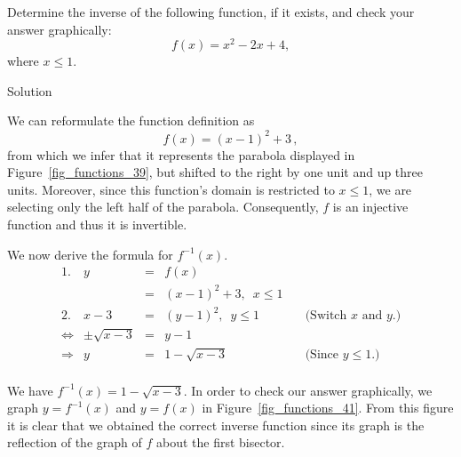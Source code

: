 \begin{example}
\label{inverserestrictionex}

Determine the inverse of the following function, if it exists, and check your answer graphically:
$$f(x) = x^2 - 2x + 4,$$
where $x \leq 1$.

\ifcalculus\pagebreak\fi
{}Solution 

We can reformulate the function definition as
$$
f(x)=(x-1)^2+3\,,
$$
from which we infer that it represents the parabola displayed in Figure~\ref{fig_functions_39}, but shifted to the right by one unit and up three units. Moreover, since this function's domain is restricted to $x \leq 1$,  we are selecting only the left half of the parabola.  Consequently, $f$ is an injective function and thus it is invertible.


We now derive the formula for $f^{-1}(x)$.
\[ \begin{array}{rrclr}
1.&y & = & f(x) & \\
& & = & (x-1)^2+3, \, \, \, x \leq 1 \\
2.&x-3 & = & (y-1)^2, \, \, \, y \leq 1 &\quad \mbox{(Switch $x$ and $y$.)} \\
\Leftrightarrow&\pm\sqrt{x-3} & = & y-1  &  \\ 
\Rightarrow&y & = & 1 - \sqrt{x-3} & \quad\mbox{(Since $y \leq 1$.)} \\
\end{array}\]

We have $f^{-1}(x) = 1 - \sqrt{x-3}$. In order to check our answer graphically, we graph $y=f^{-1}(x)$ and $y=f(x)$ in Figure~\ref{fig_functions_41}. From this figure it is clear that we obtained the correct inverse function since its graph is the reflection of the graph of $f$ about the first bisector. 




\end{example}
